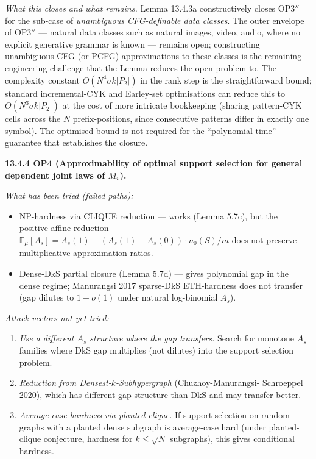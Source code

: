 \documentclass[
]{article}
\begin{document}
\emph{What this closes and what remains.} Lemma 13.4.3a constructively
closes OP3$''$ for the sub-case of \emph{unambiguous CFG-definable
data classes}. The outer envelope of OP3$''$ --- natural data classes
such as natural images, video, audio, where no explicit generative
grammar is known --- remains open; constructing unambiguous CFG (or
PCFG) approximations to these classes is the remaining engineering
challenge that the Lemma reduces the open problem to. The complexity
constant $O(N^4 \sigma k |P_2|)$ in the rank step is the
straightforward bound; standard incremental-CYK and Earley-set
optimisations can reduce this to $O(N^3 \sigma k |P_2|)$ at the cost
of more intricate bookkeeping (sharing pattern-CYK cells across the
$N$ prefix-positions, since consecutive patterns differ in exactly
one symbol). The optimised bound is not required for the
``polynomial-time'' guarantee that establishes the closure.

\textbf{13.4.4 OP4 (Approximability of optimal support selection for
general dependent joint laws of $M_v$).}

\emph{What has been tried (failed paths):}
\begin{itemize}
\item NP-hardness via CLIQUE reduction --- works (Lemma 5.7c), but
the positive-affine reduction $\mathbb{E}_\mu[A_s] = A_s(1) -
(A_s(1) - A_s(0)) \cdot n_0(S)/m$ does not preserve multiplicative
approximation ratios.
\item Dense-DkS partial closure (Lemma 5.7d) --- gives polynomial gap
in the dense regime; Manurangsi 2017 sparse-DkS ETH-hardness does
not transfer (gap dilutes to $1 + o(1)$ under natural log-binomial
$A_s$).
\end{itemize}

\emph{Attack vectors not yet tried:}
\begin{enumerate}
\item \emph{Use a different $A_s$ structure where the gap transfers.}
Search for monotone $A_s$ families where DkS gap multiplies (not
dilutes) into the support selection problem.
\item \emph{Reduction from Densest-$k$-Subhypergraph} (Chuzhoy-Manurangsi-
Schroeppel 2020), which has different gap structure than DkS and
may transfer better.
\item \emph{Average-case hardness via planted-clique.} If support
selection on random graphs with a planted dense subgraph is
average-case hard (under planted-clique conjecture, hardness for
$k \leq \sqrt{N}$ subgraphs), this gives conditional hardness.
\end{enumerate}
\end{document}
